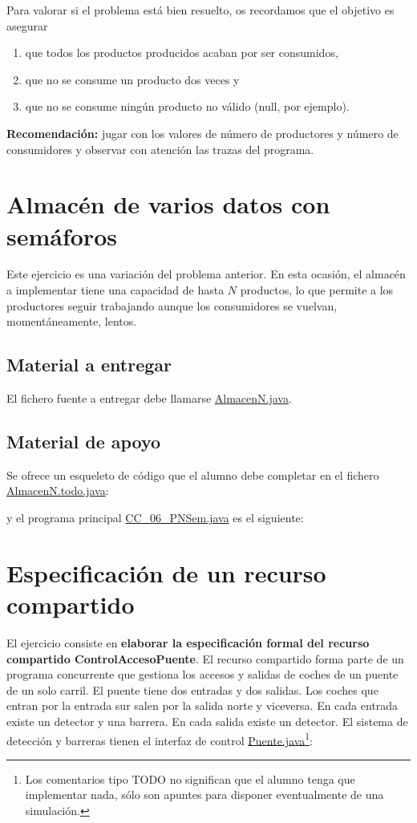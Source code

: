 \documentclass{article}
\begin{document}
Para valorar si el problema está bien resuelto, os recordamos que el
objetivo es asegurar
\begin{enumerate}
\item que todos los productos producidos acaban por ser consumidos,
\item que no se consume un producto dos veces y
\item que no se consume ningún producto no válido (null, por ejemplo).
\end{enumerate}

\noindent\textbf{Recomendación:} jugar con los valores de número de
productores y número de consumidores y observar con atención las
trazas del programa.

\clearpage
\section{Almacén de varios datos con semáforos}
Este ejercicio es una variación del problema anterior. En esta
ocasión, el almacén a implementar tiene una capacidad de hasta $N$
productos, lo que permite a los productores seguir trabajando aunque
los consumidores se vuelvan, momentáneamente, lentos.

\subsection*{Material a entregar}
El fichero fuente a entregar debe llamarse \url{AlmacenN.java}.

\subsection*{Material de apoyo}
Se ofrece un esqueleto de código que el alumno debe completar en el fichero
\url{AlmacenN.todo.java}:


y el programa principal \url{CC_06_PNSem.java} es el siguiente:


\clearpage
\section{Especificación de un recurso compartido}
El ejercicio consiste en \textbf{elaborar la especificación formal del
  recurso compartido ControlAccesoPuente}. El recurso compartido forma
parte de un programa concurrente que gestiona los accesos y salidas de
coches de un puente de un solo carril. El puente tiene dos entradas y
dos salidas.  Los coches que entran por la entrada sur salen por la
salida norte y viceversa. En cada entrada existe un detector y una
barrera. En cada salida existe un detector. El sistema de detección y
barreras tienen el interfaz de control \url{Puente.java}\footnote{Los
  comentarios tipo TODO no significan que el alumno tenga que
  implementar nada, sólo son apuntes para disponer eventualmente de
  una simulación.}:

\end{document}
